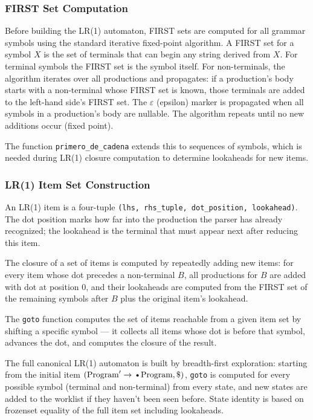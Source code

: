 \documentclass[letterpaper,12pt,oneside]{article}
\begin{document}
\subsubsection{FIRST Set Computation}
Before building the LR(1) automaton, FIRST sets are computed for all grammar symbols using the standard iterative fixed-point algorithm. A FIRST set for a symbol $X$ is the set of terminals that can begin any string derived from $X$. For terminal symbols the FIRST set is the symbol itself. For non-terminals, the algorithm iterates over all productions and propagates: if a production's body starts with a non-terminal whose FIRST set is known, those terminals are added to the left-hand side's FIRST set. The $\varepsilon$ (epsilon) marker is propagated when all symbols in a production's body are nullable. The algorithm repeats until no new additions occur (fixed point).

The function \texttt{primero\_de\_cadena} extends this to sequences of symbols, which is needed during LR(1) closure computation to determine lookaheads for new items.

\subsubsection{LR(1) Item Set Construction}
An LR(1) item is a four-tuple \texttt{(lhs, rhs\_tuple, dot\_position, lookahead)}. The dot position marks how far into the production the parser has already recognized; the lookahead is the terminal that must appear next after reducing this item.

The closure of a set of items is computed by repeatedly adding new items: for every item whose dot precedes a non-terminal $B$, all productions for $B$ are added with dot at position 0, and their lookaheads are computed from the FIRST set of the remaining symbols after $B$ plus the original item's lookahead.

The \texttt{goto} function computes the set of items reachable from a given item set by shifting a specific symbol --- it collects all items whose dot is before that symbol, advances the dot, and computes the closure of the result.

The full canonical LR(1) automaton is built by breadth-first exploration: starting from the initial item $(\text{Program}' \rightarrow \text{\textbullet Program}, \$)$, \texttt{goto} is computed for every possible symbol (terminal and non-terminal) from every state, and new states are added to the worklist if they haven't been seen before. State identity is based on frozenset equality of the full item set including lookaheads.
\end{document}
